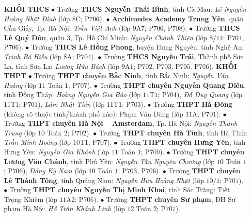 \begin{multicols}{2}
	\textbf{\color{thachthuctoanhoc}KHỐI THCS}
	\vskip 0.05cm
	$\bullet$  Trường \textbf{\color{thachthuctoanhoc}THCS Nguyễn Thái Bình}, tỉnh Cà Mau: \textit{Lê Nguyễn Hoàng Nhật Đình} (lớp $8$C; P$706$).
	\vskip 0.05cm
	$\bullet$  \textbf{\color{thachthuctoanhoc}Archimedes Academy Trung Yên}, quận Cầu Giấy, Tp. Hà Nội: \textit{Trần Việt Anh} (lớp $9$A$7$; P$706$, P$708$).
	\vskip 0.05cm
	$\bullet$  Trường \textbf{\color{thachthuctoanhoc}THCS Lê Quý Đôn}, quận $3$, Tp. Hồ Chí Minh: \textit{Nguyễn Chánh Thiện} (lớp $8/14$; P$701$, P$706$).
	\vskip 0.05cm
	$\bullet$  Trường \textbf{\color{thachthuctoanhoc}THCS Lê Hồng Phong}, huyện Hưng Nguyên, tỉnh Nghệ An: \textit{Trịnh Bá Hiếu} (lớp $8$A; P$704$).
	\vskip 0.05cm
	$\bullet$  Trường \textbf{\color{thachthuctoanhoc}THCS Nguyễn Trãi}, Thành phố Sơn La, tỉnh Sơn La: \textit{Lương Hữu Bách} (lớp $9$A$1$; P$702$, P$703$, P$705$, P$706$).
	\vskip 0.05cm
	\textbf{\color{thachthuctoanhoc}KHỐI THPT}
	\vskip 0.05cm
	$\bullet$  Trường \textbf{\color{thachthuctoanhoc}THPT chuyên Bắc Ninh}, tỉnh Bắc Ninh: \textit{Nguyễn Văn Hoàng} (lớp $11$ Toán $1$; P$707$).
	\vskip 0.05cm
	$\bullet$  Trường \textbf{\color{thachthuctoanhoc}THPT chuyên Nguyễn Quang Diêu}, tỉnh Đồng Tháp: \textit{Hoàng Nguyễn Gia Bảo} (lớp $11$T$1$; P$704$), \textit{Đỗ Duy Quang} (lớp $11$T$1$; P$701$), \textit{Lâm Nhật Tiến} (lớp $11$T$1$; P$703$).
	\vskip 0.05cm
	$\bullet$  Trường \textbf{\color{thachthuctoanhoc}THPT Hà Đông} (không rõ thuộc tỉnh/thành phố nào): Phạm Văn Đăng (lớp $11$A; P$701$).
	\vskip 0.05cm
	$\bullet$  Trường \textbf{\color{thachthuctoanhoc}THPT chuyên Hà Nội -- Amsterdam}, Tp. Hà Nội: \textit{Nguyễn Thành Trung} (lớp $10$ Toán $2$; P$702$).
	\vskip 0.05cm
	$\bullet$  Trường \textbf{\color{thachthuctoanhoc}THPT chuyên Hà Tĩnh}, tỉnh Hà Tĩnh: \textit{Trần Minh Hoàng} (lớp $10$T$1$; P$707$).
	\vskip 0.05cm
	$\bullet$  Trường \textbf{\color{thachthuctoanhoc}THPT chuyên Hưng Yên}, tỉnh Hưng Yên: \textit{Nguyễn Gia Khánh} (lớp $11$ Toán $1$; P$709$).
	\vskip 0.05cm
	$\bullet$  Trường \textbf{\color{thachthuctoanhoc}THPT chuyên Lương Văn Chánh}, tỉnh Phú Yên: \textit{Nguyễn Tấn Nguyên Chương} (lớp $10$ Toán $1$; P$706$), \textit{Đặng Kỳ Nam} (lớp $10$ Toán $1$; P$703$, P$706$).
	\vskip 0.05cm
	$\bullet$  Trường \textbf{\color{thachthuctoanhoc}THPT chuyên Lê Thánh Tông}, tỉnh Quảng Nam: \textit{Nguyễn Hữu Hoàng Nhật} (lớp $10/1$; P$701$).
	\vskip 0.05cm
	$\bullet$  Trường \textbf{\color{thachthuctoanhoc}THPT chuyên Nguyễn Thị Minh Khai}, tỉnh Sóc Trăng: Tiết Trọng Khiêm (lớp $11$A$2$; P$706$).
	\vskip 0.05cm
	$\bullet$  Trường \textbf{\color{thachthuctoanhoc}THPT chuyên Sư phạm}, ĐH Sư phạm Hà Nội: \textit{Hồ Trần Khánh Linh} (lớp $12$ Toán $2$; P$707$).
\end{multicols}
